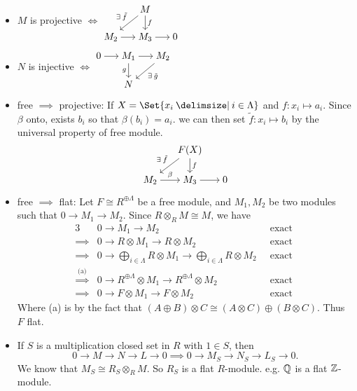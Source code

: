 \begin{fact} \mbox{}
  \begin{itemize}
    \item $M$ is projective $\iff$
      $\begin{tikzcd}[cramped, sep=15pt]
         & M \ar[dl, "\exists \tilde f"'] \ar[d, "f"] \\
        M_2 \ar[r] & M_3 \ar[r] & 0
      \end{tikzcd}$
    \item $N$ is injective $\iff$
      $\begin{tikzcd}[cramped, sep=15pt]
        0 \ar[r] & M_1 \ar[d, "g"'] \ar[r] & M_2 \ar[dl, "\exists \tilde g"] \\
         & N
      \end{tikzcd}$
    \item free $\implies$ projective:
      If $X = \Set{ x_i \given i \in \Lambda}$ and $f: x_i \mapsto a_i$.
      Since $\beta$ onto, exists $b_i$ so that $\beta(b_i) = a_i$.
      we can then set $\tilde f: x_i \mapsto b_i$ by the universal
      property of free module.
      \[\begin{tikzcd}[cramped, sep=15pt]
        & F(X) \ar[dl, "\exists \tilde f"'] \ar[d, "f"] \\
        M_2 \ar[r, "\beta"] & M_3 \ar[r] & 0
      \end{tikzcd}\]
    \item free $\implies$ flat:
      Let $F \cong R^{\oplus \Lambda}$ be a free module,
      and $M_1, M_2$ be two modules such that $0 \to M_1 \to M_2$.
      Since $R \otimes_R M \cong M$, we have
      \begin{alignat*}{3}
        & 0 \to M_1 \to M_2 & \text{ exact } \\
        \implies & 0 \to R \otimes M_1 \to R \otimes M_2 & \text{ exact } \\
        \implies & 0 \to \bigoplus_{i \in \Lambda} R \otimes M_1 \to
        \bigoplus_{i \in \Lambda} R \otimes M_2 \ & \text{ exact } \\
        \stackrel{\text{(a)}}{\implies} & 0 \to R^{\oplus \Lambda} \otimes M_1 \to
        R^{\oplus \Lambda} \otimes M_2 & \text{ exact } \\
        \implies & 0 \to F \otimes M_1 \to F \otimes M_2 & \text{ exact }
      \end{alignat*}
      Where (a) is by the fact that $(A \oplus B) \otimes C \cong
      (A\otimes C) \oplus (B \otimes C)$. Thus $F$ flat.

    \item If $S$ is a multiplication closed set in $R$ with $1 \in S$, then
      \[ 0 \to M \to N \to L \to 0 \implies 0 \to M_S \to N_S \to L_S \to 0. \]
      We know that $M_S \cong R_S \otimes_R M$. So $R_S$ is a flat $R$-module.
      e.g. $\mathbb{Q}$ is a flat $\mathbb{Z}$-module.
  \end{itemize}
\end{fact}

